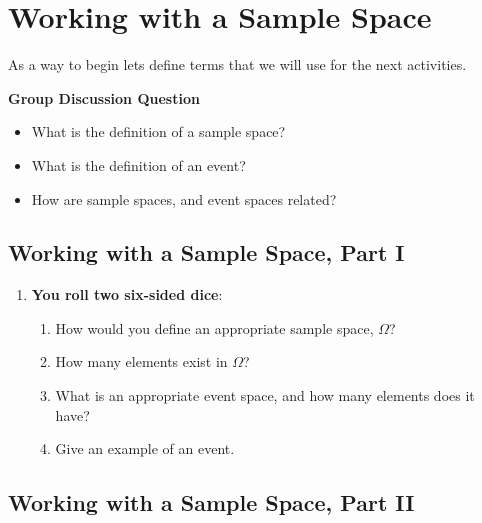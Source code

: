 \documentclass[
]{book}
\providecommand{\tightlist}{%
  \setlength{\itemsep}{0pt}\setlength{\parskip}{0pt}}
\theoremstyle{definition}
\theoremstyle{definition}
\theoremstyle{definition}
\theoremstyle{definition}
\theoremstyle{remark}
\begin{document}
\hypertarget{working-with-a-sample-space}{%
\section{Working with a Sample Space}\label{working-with-a-sample-space}}

As a way to begin lets define terms that we will use for the next activities.

\begin{discussion-question}

\textbf{Group Discussion Question}

\begin{itemize}
\tightlist
\item
  What is the definition of a sample space?
\item
  What is the definition of an event?
\item
  How are sample spaces, and event spaces related?
\end{itemize}

\end{discussion-question}

\hypertarget{working-with-a-sample-space-part-i}{%
\subsection{Working with a Sample Space, Part I}\label{working-with-a-sample-space-part-i}}

\begin{enumerate}
\def\labelenumi{\arabic{enumi}.}
\tightlist
\item
  \textbf{You roll two six-sided dice}:

  \begin{enumerate}
  \def\labelenumii{\arabic{enumii}.}
  \tightlist
  \item
    How would you define an appropriate sample space, \(\Omega\)?
  \item
    How many elements exist in \(\Omega\)?
  \item
    What is an appropriate event space, and how many elements does it have?
  \item
    Give an example of an event.
  \end{enumerate}
\end{enumerate}

\vspace{5cm}

\hypertarget{working-with-a-sample-space-part-ii}{%
\subsection{Working with a Sample Space, Part II}\label{working-with-a-sample-space-part-ii}}
\end{document}
